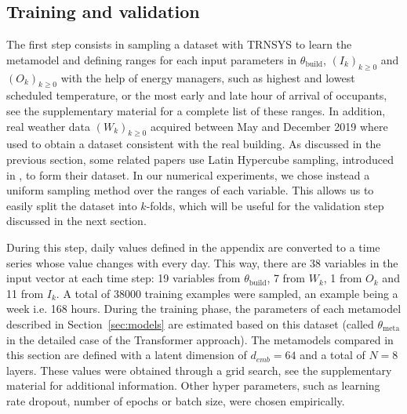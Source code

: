 \documentclass[12pt]{article}
\begin{document}
\subsection{Training and validation}
\label{sec:training}
The first step consists in sampling a dataset with TRNSYS to learn the metamodel and  defining ranges for each input parameters in $\theta_{\mathrm{build}}$, $(I_k)_{k\geqslant 0}$ and $(O_k)_{k\geqslant 0}$ with the help of energy managers, such as highest and lowest scheduled temperature, or the most early and late hour of arrival of occupants, see the supplementary material for a complete list of these ranges. In addition, real weather data $(W_k)_{k\geqslant 0}$ acquired between May and December 2019 where used to obtain a dataset consistent with the real building. As discussed in the previous section, some related papers use Latin Hypercube sampling, introduced in \cite{McKay2000ACO}, to form their dataset. In our numerical experiments, we chose instead a uniform sampling method over the ranges of each variable. This allows us to easily split the dataset into $k$-folds, which will be useful for the validation step discussed in the next section.

During this step, daily values defined in the appendix are converted to a time series whose value changes with every day. This way, there are 38 variables in the input vector at each time step: 19 variables from $\theta_{\mathrm{build}}$, 7 from $W_k$, 1 from $O_k$ and 11 from $I_k$. A total of 38000 training examples were sampled, an example being a week i.e. 168 hours.
During the training phase, the parameters of each metamodel described in Section~\ref{sec:models} are estimated based on this dataset (called  $\theta_{\mathrm{meta}}$ in the detailed case of the Transformer approach). The metamodels compared in this section are defined with a latent dimension of $d_{emb} = 64$ and a total of $N=8$ layers. These values were obtained through a grid search, see the supplementary material for additional information. Other hyper parameters, such as learning rate dropout, number of epochs or batch size, were chosen empirically.

\end{document}
